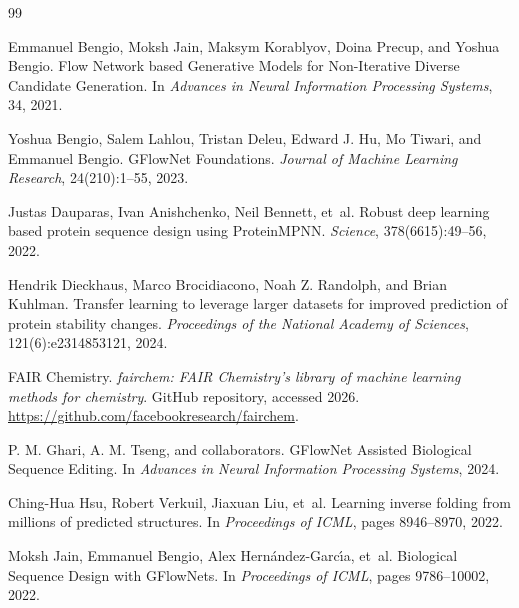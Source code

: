 \documentclass[11pt]{article}
\begin{document}
	\begin{thebibliography}{99}
		
		Emmanuel Bengio, Moksh Jain, Maksym Korablyov, Doina Precup, and Yoshua Bengio.
		\newblock Flow Network based Generative Models for Non-Iterative Diverse Candidate Generation.
		\newblock In \emph{Advances in Neural Information Processing Systems}, 34, 2021.
		
		Yoshua Bengio, Salem Lahlou, Tristan Deleu, Edward J. Hu, Mo Tiwari, and Emmanuel Bengio.
		\newblock GFlowNet Foundations.
		\newblock \emph{Journal of Machine Learning Research}, 24(210):1--55, 2023.
		
		Justas Dauparas, Ivan Anishchenko, Neil Bennett, et~al.
		\newblock Robust deep learning based protein sequence design using ProteinMPNN.
		\newblock \emph{Science}, 378(6615):49--56, 2022.
		
		Hendrik Dieckhaus, Marco Brocidiacono, Noah Z. Randolph, and Brian Kuhlman.
		\newblock Transfer learning to leverage larger datasets for improved prediction of protein stability changes.
		\newblock \emph{Proceedings of the National Academy of Sciences}, 121(6):e2314853121, 2024.
		
		FAIR Chemistry.
		\newblock \emph{fairchem: FAIR Chemistry's library of machine learning methods for chemistry}.
		\newblock GitHub repository, accessed 2026. \url{https://github.com/facebookresearch/fairchem}.
		
		P. M. Ghari, A. M. Tseng, and collaborators.
		\newblock GFlowNet Assisted Biological Sequence Editing.
		\newblock In \emph{Advances in Neural Information Processing Systems}, 2024.
		
		Ching-Hua Hsu, Robert Verkuil, Jiaxuan Liu, et~al.
		\newblock Learning inverse folding from millions of predicted structures.
		\newblock In \emph{Proceedings of ICML}, pages 8946--8970, 2022.
		
		Moksh Jain, Emmanuel Bengio, Alex Hern{\'a}ndez-Garc{\'\i}a, et~al.
		\newblock Biological Sequence Design with GFlowNets.
		\newblock In \emph{Proceedings of ICML}, pages 9786--10002, 2022.
		

\end{thebibliography}
\end{document}
